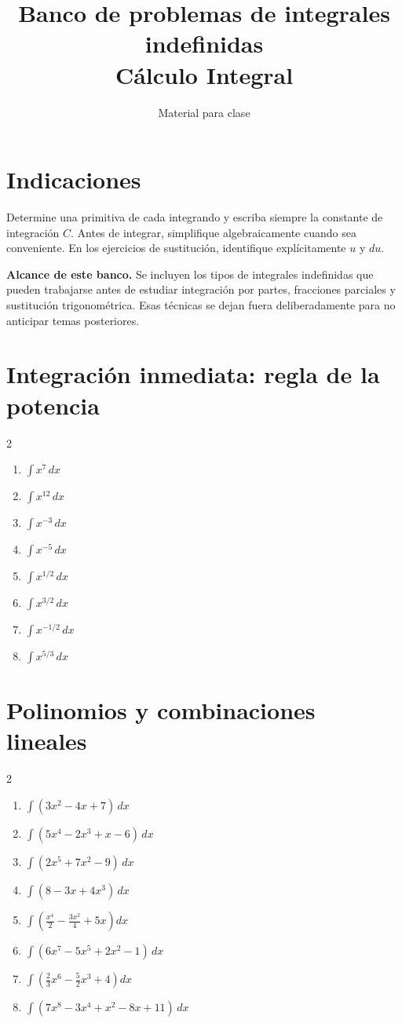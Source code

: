 \documentclass[11pt]{article}
\title{\textbf{Banco de problemas de integrales indefinidas}\\\large Cálculo Integral}
\author{Material para clase}
\date{}
\begin{document}
\maketitle
\tableofcontents
\bigskip

\section*{Indicaciones}
Determine una primitiva de cada integrando y escriba siempre la constante de integración $C$. Antes de integrar, simplifique algebraicamente cuando sea conveniente. En los ejercicios de sustitución, identifique explícitamente $u$ y $du$.

\textbf{Alcance de este banco.} Se incluyen los tipos de integrales indefinidas que pueden trabajarse antes de estudiar integración por partes, fracciones parciales y sustitución trigonométrica. Esas técnicas se dejan fuera deliberadamente para no anticipar temas posteriores.

\section{Integración inmediata: regla de la potencia}
\begin{multicols}{2}\begin{enumerate}
\item $\displaystyle \int x^7\,dx$
\item $\displaystyle \int x^{12}\,dx$
\item $\displaystyle \int x^{-3}\,dx$
\item $\displaystyle \int x^{-5}\,dx$
\item $\displaystyle \int x^{1/2}\,dx$
\item $\displaystyle \int x^{3/2}\,dx$
\item $\displaystyle \int x^{-1/2}\,dx$
\item $\displaystyle \int x^{5/3}\,dx$
\end{enumerate}\end{multicols}

\section{Polinomios y combinaciones lineales}
\begin{multicols}{2}\begin{enumerate}
\item $\displaystyle \int(3x^2-4x+7)\,dx$
\item $\displaystyle \int(5x^4-2x^3+x-6)\,dx$
\item $\displaystyle \int(2x^5+7x^2-9)\,dx$
\item $\displaystyle \int(8-3x+4x^3)\,dx$
\item $\displaystyle \int\left(\frac{x^4}{2}-\frac{3x^2}{4}+5x\right)dx$
\item $\displaystyle \int(6x^7-5x^5+2x^2-1)\,dx$
\item $\displaystyle \int\left(\frac{2}{3}x^6-\frac{5}{2}x^3+4\right)dx$
\item $\displaystyle \int(7x^8-3x^4+x^2-8x+11)\,dx$
\end{enumerate}\end{multicols}
\end{document}
